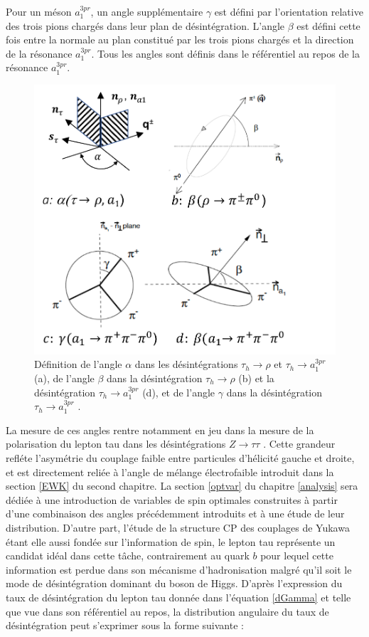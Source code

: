 Pour un méson $a_1^{3pr}$, un angle supplémentaire $\gamma$ est défini par l'orientation relative des trois pions chargés dans leur plan de désintégration. L'angle $\beta$ est défini cette fois entre la normale au plan constitué par les trois pions chargés et la direction de la résonance $a_1^{3pr}$. Tous les angles sont définis dans le référentiel au repos de la résonance $a_1^{3pr}$. \\

\begin{figure}[!ht]
    \centering
    \includegraphics[scale=0.7]{Chapitre6/Images/angles.pdf}
    \caption{Définition de l'angle $\alpha$ dans les désintégrations $\tau_h\to\rho$ et $\tau_h\to a_1^{3pr}$ (a), de l'angle $\beta$ dans la désintégration $\tau_h\to\rho$ (b) et la désintégration $\tau_h\to a_1^{3pr}$ (d), et de l'angle $\gamma$ dans la désintégration $\tau_h\to a_1^{3pr}$ \cite{Zpol}.}
    \label{angles}
\end{figure}

La mesure de ces angles rentre notamment en jeu dans la mesure de la polarisation du lepton tau dans les désintégrations $Z\rightarrow\tau\tau$ \cite{Zpol}. Cette grandeur refléte l'asymétrie du couplage faible entre particules d'hélicité gauche et droite, et est directement reliée à l'angle de mélange électrofaible introduit dans la section \ref{EWK} du second chapitre. La section \ref{optvar} du chapitre \ref{analysis} sera dédiée à une introduction de variables de spin optimales construites à partir d'une combinaison des angles précédemment introduits et à une étude de leur distribution. D'autre part, l'étude de la structure CP des couplages de Yukawa étant elle aussi fondée sur l'information de spin, le lepton tau représente un candidat idéal dans cette tâche, contrairement au quark $b$ pour lequel cette information est perdue dans son mécanisme d'hadronisation malgré qu'il soit le mode de désintégration dominant du boson de Higgs.
D'après l'expression du taux de désintégration du lepton tau donnée dans l'équation \ref{dGamma} et telle que vue dans son référentiel au repos, la distribution angulaire du taux de désintégration peut s'exprimer sous la forme suivante :

